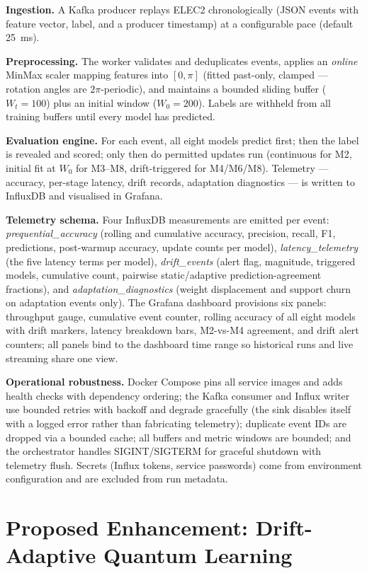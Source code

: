 \documentclass[conference]{IEEEtran}
\begin{document}
\textbf{Ingestion.} A Kafka producer replays ELEC2 chronologically (JSON events with
feature vector, label, and a producer timestamp) at a configurable pace (default 25~ms).

\textbf{Preprocessing.} The worker validates and deduplicates events, applies an
\emph{online} MinMax scaler mapping features into $[0,\pi]$ (fitted past-only, clamped ---
rotation angles are $2\pi$-periodic), and maintains a bounded sliding buffer
($W_t = 100$) plus an initial window ($W_0 = 200$). Labels are withheld from all training
buffers until every model has predicted.

\textbf{Evaluation engine.} For each event, all eight models predict first; then the label
is revealed and scored; only then do permitted updates run (continuous for M2, initial fit
at $W_0$ for M3--M8, drift-triggered for M4/M6/M8). Telemetry --- accuracy, per-stage
latency, drift records, adaptation diagnostics --- is written to InfluxDB and visualised in
Grafana.

\textbf{Telemetry schema.} Four InfluxDB measurements are emitted per event:
\emph{prequential\_accuracy} (rolling and cumulative accuracy, precision, recall, F1,
predictions, post-warmup accuracy, update counts per model),
\emph{latency\_telemetry} (the five latency terms per model),
\emph{drift\_events} (alert flag, magnitude, triggered models, cumulative count, pairwise
static/adaptive prediction-agreement fractions), and \emph{adaptation\_diagnostics}
(weight displacement and support churn on adaptation events only). The Grafana dashboard
provisions six panels: throughput gauge, cumulative event counter, rolling accuracy of all
eight models with drift markers, latency breakdown bars, M2-vs-M4 agreement, and drift
alert counters; all panels bind to the dashboard time range so historical runs and live
streaming share one view.

\textbf{Operational robustness.} Docker Compose pins all service images and adds health
checks with dependency ordering; the Kafka consumer and Influx writer use bounded retries
with backoff and degrade gracefully (the sink disables itself with a logged error rather
than fabricating telemetry); duplicate event IDs are dropped via a bounded cache; all
buffers and metric windows are bounded; and the orchestrator handles SIGINT/SIGTERM for
graceful shutdown with telemetry flush. Secrets (Influx tokens, service passwords) come
from environment configuration and are excluded from run metadata.

\section{Proposed Enhancement: Drift-Adaptive Quantum Learning}
\label{sec:enh}
\end{document}
